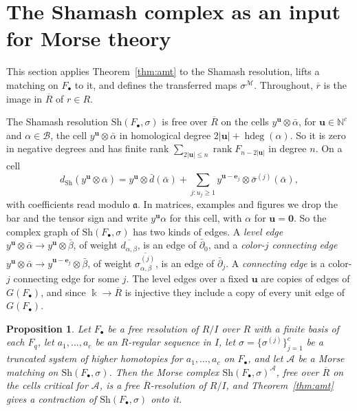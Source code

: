 \documentclass[12pt]{amsart}
\theoremstyle{plain}
\newtheorem{proposition}[theorem]{Proposition}
\theoremstyle{definition}
\newcommand{\kk}{\Bbbk}
\newcommand{\F}{ {F_\bullet} }
\newcommand{\Rbar}{\overline{R}}
\newcommand{\M}{\mathcal{M}}
\newcommand{\A}{\mathcal{A}}
\newcommand{\B}{\mathcal{B}}
\newcommand{\hdeg}{\operatorname{hdeg}}
\newcommand{\aaa}{\mathfrak{a}}
\newcommand{\N}{\mathbb{N}}
\newcommand{\Sh}{\mathrm{Sh}}
\begin{document}
\section{The Shamash complex as an input for Morse theory}\label{sec:hyp}

This section applies Theorem~\ref{thm:amt} to the Shamash resolution, lifts a matching on $\F$ to it, and defines the transferred maps $\sigma^{\M}$. Throughout, $\overline r$ is the image in $\Rbar$ of $r \in R$.

The Shamash resolution $\Sh(\F, \sigma)$ is free over $\Rbar$ on the cells $y^{\boldsymbol{u}} \otimes \bar\alpha$, for $\boldsymbol{u} \in \N^c$ and $\alpha \in \B$, the cell $y^{\boldsymbol{u}} \otimes \bar\alpha$ in homological degree $2|\boldsymbol{u}| + \hdeg(\alpha)$. So it is zero in negative degrees and has finite rank $\sum_{2|\boldsymbol{u}| \le n} \operatorname{rank} F_{n - 2|\boldsymbol{u}|}$ in degree $n$. On a cell
\[
    d_{\Sh}(y^{\boldsymbol{u}} \otimes \bar\alpha) = y^{\boldsymbol{u}} \otimes \bar d(\bar\alpha) + \sum_{j : u_j \ge 1} y^{\boldsymbol{u} - \boldsymbol{e}_j} \otimes \bar\sigma^{(j)}(\bar\alpha),
\]
with coefficients read modulo $\aaa$. In matrices, examples and figures we drop the bar and the tensor sign and write $y^{\boldsymbol{u}} \alpha$ for this cell, with $\alpha$ for $\boldsymbol{u} = \boldsymbol{0}$. So the complex graph of $\Sh(\F, \sigma)$ has two kinds of edges. A \emph{level edge} $y^{\boldsymbol{u}} \otimes \bar\alpha \to y^{\boldsymbol{u}} \otimes \bar\beta$, of weight $\overline{d_{\alpha,\beta}}$, is an edge of $\bar\partial_0$, and a \emph{color-$j$ connecting edge} $y^{\boldsymbol{u}} \otimes \bar\alpha \to y^{\boldsymbol{u} - \boldsymbol{e}_j} \otimes \bar\beta$, of weight $\overline{\sigma^{(j)}_{\alpha,\beta}}$, is an edge of $\bar\partial_j$. A \emph{connecting edge} is a color-$j$ connecting edge for some $j$. The level edges over a fixed $\boldsymbol{u}$ are copies of edges of $G(\F)$, and since $\kk \to \Rbar$ is injective they include a copy of every unit edge of $G(\F)$.

\begin{proposition}\label{thm:A}
    Let $\F$ be a free resolution of $R/I$ over $R$ with a finite basis of each $F_q$, let $a_1, \dots, a_c$ be an $R$-regular sequence in $I$, let $\sigma = \{\sigma^{(j)}\}_{j=1}^c$ be a truncated system of higher homotopies for $a_1, \dots, a_c$ on $\F$, and let $\A$ be a Morse matching on $\Sh(\F, \sigma)$. Then the Morse complex $\Sh(\F, \sigma)^{\A}$, free over $\Rbar$ on the cells critical for $\A$, is a free $\Rbar$-resolution of $R/I$, and Theorem~\ref{thm:amt} gives a contraction of $\Sh(\F, \sigma)$ onto it.
\end{proposition}
\end{document}
